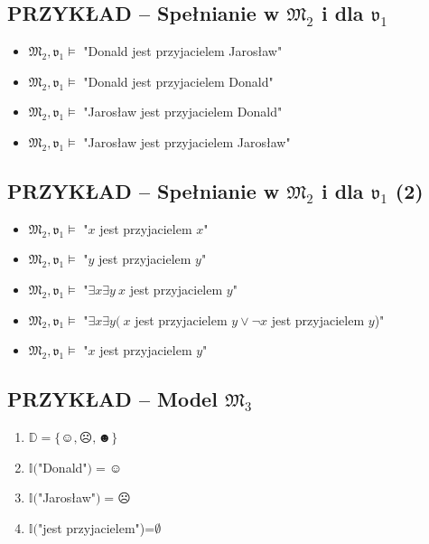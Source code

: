 \documentclass[12pt]{article}
\begin{document}
\subsection{PRZYKŁAD -- Spełnianie w $\mathfrak{M}_2$ i dla $\mathfrak{v}_1$}
%
\begin{itemize}
\item $\mathfrak{M}_2,\mathfrak{v}_1 \vDash$ "Donald jest przyjacielem Jarosław"%
\item $\mathfrak{M}_2,\mathfrak{v}_1 \vDash$ "Donald jest przyjacielem Donald"%
\item $\mathfrak{M}_2,\mathfrak{v}_1 \vDash$ "Jarosław jest przyjacielem Donald"%
\item $\mathfrak{M}_2,\mathfrak{v}_1 \vDash$ "Jarosław jest przyjacielem Jarosław"
\end{itemize}
%

\subsection{PRZYKŁAD -- Spełnianie w $\mathfrak{M}_2$ i dla $\mathfrak{v}_1$ (2)}
%
\begin{itemize}
\item $\mathfrak{M}_2,\mathfrak{v}_1 \vDash$ "$x$ jest przyjacielem $x$"%
\item $\mathfrak{M}_2,\mathfrak{v}_1 \vDash$ "$y$ jest przyjacielem $y$"%
\item $\mathfrak{M}_2,\mathfrak{v}_1 \vDash$ "$\exists x \exists y ~x$ jest przyjacielem $y$"%
\item $\mathfrak{M}_2,\mathfrak{v}_1 \vDash$ "$\exists x \exists y ( ~x$ jest przyjacielem $y \lor \neg x$ jest przyjacielem $y$)"%
\item $\mathfrak{M}_2,\mathfrak{v}_1 \vDash$ "$x$ jest przyjacielem $y$"
\end{itemize}
%

\subsection{PRZYKŁAD -- Model $\mathfrak{M}_3$}
%
\begin{enumerate}
    \item $\mathbb{D} = \{\smiley{}, \frownie{}, \blacksmiley{} \}$%
    \item $\mathbb{I}($"Donald"$)=\smiley{}$%
    \item $\mathbb{I}($"Jarosław"$)=\frownie{}$%
    \item $\mathbb{I}($"jest przyjacielem")=$\emptyset$
\end{enumerate}
%
\end{document}
